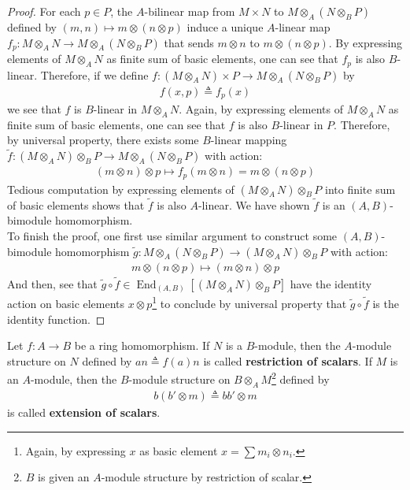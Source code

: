 \documentclass{report}
\begin{document}
\begin{proof}
For each $p \in P$, the $A$-bilinear map from  $M\times N$ to $M \otimes_A (N \otimes _B P)$ defined by $(m,n)\mapsto  m \otimes  (n \otimes  p)$ induce a unique $A$-linear map $f_p:M\otimes _A N \to M\otimes _A(N\otimes _B P)$ that sends $m\otimes  n$ to $m\otimes (n \otimes  p)$. By expressing elements of $M \otimes_A N$ as finite sum of basic elements, one can see that $f_p$ is also  $B$-linear. Therefore, if we define $f:(M\otimes _A N) \times P\rightarrow M \otimes _A (N \otimes  _B P)$ by 
\begin{align*}
f(x,p)\triangleq f_p(x)
\end{align*}
we see that $f$ is $B$-linear in $M\otimes _A N$. Again, by expressing elements of $M \otimes  _A N$ as finite sum of basic elements, one can see that $f$ is also  $B$-linear in  $P$. Therefore, by universal property, there exists some $B$-linear mapping  $\tilde{f}:(M\otimes _A N) \otimes_B  P\rightarrow M \otimes _A (N \otimes  _B P)$  with action:
\begin{align*}
  (m \otimes  n)\otimes p \mapsto   f_p(m\otimes n)=m\otimes  (n \otimes  p)
\end{align*}
Tedious computation by expressing elements of $(M \otimes _A N)\otimes _B P$ into finite sum of basic elements shows that $\tilde{f}$ is also $A$-linear. We have shown $\tilde{f}$ is an $(A,B)$-bimodule homomorphism.  \\

To finish the proof, one first use similar argument to construct some  $(A,B)$-bimodule homomorphism $\tilde{g}: M \otimes_A (N \otimes _B P)\rightarrow (M\otimes _A N)\otimes_B P$ with action: 
\begin{align*}
  m \otimes  (n \otimes  p)\mapsto (m\otimes  n)\otimes  p
\end{align*}
And then, see that $\tilde{g}\circ \tilde{f}\in \operatorname{End}_{(A,B)}[(M\otimes_ AN)\otimes _BP]$ have the identity action on basic elements $x\otimes  p$\footnote{Again, by expressing $x$ as basic element  $x= \sum m_i \otimes  n_i$.} to conclude by universal property that $\tilde{g}\circ \tilde{f}$ is the identity function. 
\end{proof}
\begin{mdframed}
Let $f:A\rightarrow B$ be a ring homomorphism. If $N$ is a  $B$-module, then the  $A$-module structure on  $N$ defined by $an\triangleq f(a)n$ is called \textbf{restriction of scalars}. If $M$ is an $A$-module, then the  $B$-module structure on  $B\otimes _A M$\footnote{$B$ is given an $A$-module structure by restriction of scalar.} defined by 
\begin{align*}
b(b' \otimes  m)\triangleq  bb' \otimes  m
\end{align*}
is called \textbf{extension of scalars}. 
\end{mdframed}
\end{document}
